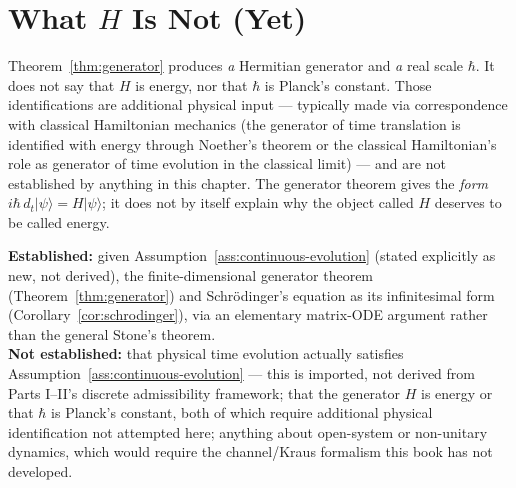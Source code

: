 \section{What \texorpdfstring{$H$}{H} Is Not (Yet)}

Theorem~\ref{thm:generator} produces \emph{a} Hermitian generator and \emph{a}
real scale $\hbar$. It does not say that $H$ is energy, nor that $\hbar$ is
Planck's constant. Those identifications are additional physical input —
typically made via correspondence with classical Hamiltonian mechanics (the
generator of time translation is identified with energy through Noether's
theorem or the classical Hamiltonian's role as generator of time evolution in
the classical limit) — and are not established by anything in this chapter.
The generator theorem gives the \emph{form} $i\hbar\,d_t|\psi\rangle =
H|\psi\rangle$; it does not by itself explain why the object called $H$
deserves to be called energy.

\begin{ledgerentry}
\textbf{Established:} given Assumption~\ref{ass:continuous-evolution} (stated
explicitly as new, not derived), the finite-dimensional generator theorem
(Theorem~\ref{thm:generator}) and Schr\"odinger's equation as its
infinitesimal form (Corollary~\ref{cor:schrodinger}), via an elementary
matrix-ODE argument rather than the general Stone's theorem.\\
\textbf{Not established:} that physical time evolution actually satisfies
Assumption~\ref{ass:continuous-evolution} — this is imported, not derived
from Parts I--II's discrete admissibility framework; that the generator $H$
is energy or that $\hbar$ is Planck's constant, both of which require
additional physical identification not attempted here; anything about
open-system or non-unitary dynamics, which would require the channel/Kraus
formalism this book has not developed.
\end{ledgerentry}
